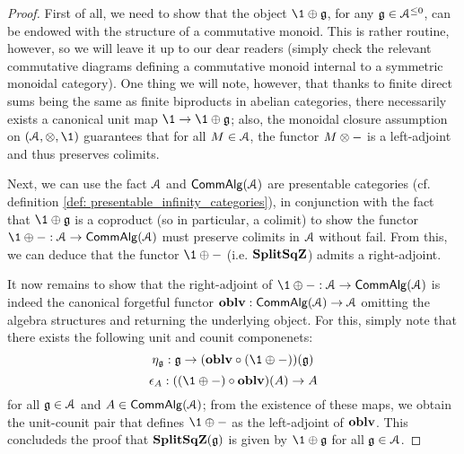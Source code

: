                         \begin{proof}
                            First of all, we need to show that the object $\1 \oplus \g$, for any $\mathfrak{g} \in \mathcal{A}^{\leq 0}$, can be endowed with the structure of a commutative monoid. This is rather routine, however, so we will leave it up to our dear readers (simply check the relevant commutative diagrams defining a commutative monoid internal to a symmetric monoidal category). One thing we will note, however, that thanks to finite direct sums being the same as finite biproducts in abelian categories, there necessarily exists a canonical unit map $\1 \to \1 \oplus \g$; also, the monoidal closure assumption on $(\calA, \tensor, \1)$ guarantees that for all $M \in \mathcal{A}$, the functor $M \tensor -$ is a left-adjoint and thus preserves colimits.
                            
                            Next, we can use the fact $\mathcal{A}$ and $\mathsf{Comm}\mathsf{Alg}(\mathcal{A})$ are presentable categories (cf. definition \ref{def: presentable_infinity_categories}), in conjunction with the fact that $\1 \oplus \g$ is a coproduct (so in particular, a colimit) to show the functor $\1 \oplus -: \calA \to \Comm\Alg(\calA)$ must preserve colimits in $\mathcal{A}$ without fail. From this, we can deduce that the functor $\1 \oplus -$ (i.e. $\mathbf{Split}\mathbf{Sq}\mathbf{Z}$) admits a right-adjoint.
                            
                            It now remains to show that the right-adjoint of $\1 \oplus -: \calA \to \Comm\Alg(\calA)$ is indeed the canonical forgetful functor $\mathbf{oblv}: \mathsf{Comm}\mathsf{Alg}(\mathcal{A}) \to \mathcal{A}$ omitting the algebra structures and returning the underlying object. For this, simply note that there exists the following unit and counit componenets:
                                $$\eta_{\g}: \g \to ( \oblv \circ (\1 \oplus -) )(\g)$$
                                $$\e_A: ( (\1 \oplus -) \circ \oblv )(A) \to A$$
                            for all $\mathfrak{g} \in \mathcal{A}$ and $A \in \mathsf{Comm}\mathsf{Alg}(\mathcal{A})$; from the existence of these maps, we obtain the unit-counit pair that defines $\1 \oplus -$ as the left-adjoint of $\mathbf{oblv}$. This concludeds the proof that $\mathbf{Split}\mathbf{Sq}\mathbf{Z}(\mathfrak{g})$ is given by $\1 \oplus \g$ for all $\mathfrak{g} \in \mathcal{A}$.
                        \end{proof}
